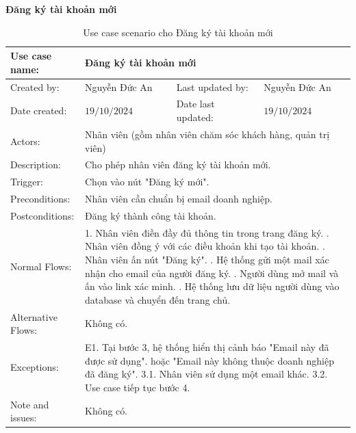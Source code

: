 \textbf{Đăng ký tài khoản mới}
\begin{table}[H]
	\centering
	\begin{tabular}{|l|l|l|l|} 
		\hline Use case name: & \multicolumn{3}{|l|}{Đăng ký tài khoản mới} \\ 
		\hline Created by: & Nguyễn Đức An & Last updated by: & Nguyễn Đức An \\ 
		\hline Date created: & $19 / 10 / 2024$ & Date last updated: & $19 / 10 / 2024$\\ 
		\hline Actors: & \multicolumn{3}{|l|}{ Nhân viên (gồm nhân viên chăm sóc khách hàng, quản trị viên) } \\ 
		\hline Description: & \multicolumn{3}{|p{12cm}|}{ Cho phép nhân viên đăng ký tài khoản mới. } \\ 
		\hline Trigger: & \multicolumn{3}{|p{12cm}|}{ Chọn vào nút "Đăng ký mới". } \\ 
		\hline Preconditions: & \multicolumn{3}{|p{12cm}|}{ Nhân viên cần chuẩn bị email doanh nghiệp. } \\ 
		\hline Postconditions: & \multicolumn{3}{|p{12cm}|}{ Đăng ký thành công tài khoản. } \\ 
		\hline Normal Flows: & \multicolumn{3}{|p{12cm}|}{
			1. Nhân viên điền đầy đủ thông tin trong trang đăng ký. \newline
			2. Nhân viên đồng ý với các điều khoản khi tạo tài khoản. \newline
			3. Nhân viên ấn nút "Đăng ký". \newline
			4. Hệ thống gửi một mail xác nhận cho email của người đăng ký. \newline
			5. Người dùng mở mail và ấn vào link xác minh. \newline
			6. Hệ thống lưu dữ liệu người dùng vào database và chuyển đến trang chủ. 
		} \\ 
		\hline Alternative Flows: & \multicolumn{3}{|p{12cm}|}{ Không có. } \\ 
		\hline Exceptions: & \multicolumn{3}{|p{12cm}|}{
			E1. Tại bước 3, hệ thống hiển thị cảnh báo "Email này đã được sử dụng". \newline
			hoặc "Email này không thuộc doanh nghiệp đã đăng ký". \newline
			\hspace{2cm}3.1. Nhân viên sử dụng một email khác. \newline
			\hspace{2cm}3.2. Use case tiếp tục bước 4. 
		} \\ 
		\hline Note and issues: & \multicolumn{3}{|p{12cm}|}{ Không có. } \\ 
		\hline
	\end{tabular}
	\caption{Use case scenario cho Đăng ký tài khoản mới}
\end{table}


